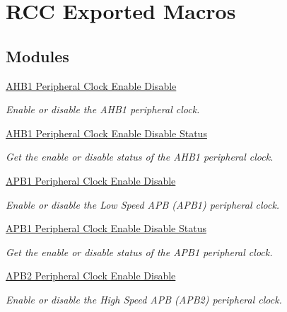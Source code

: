 \hypertarget{group___r_c_c___exported___macros}{}\section{R\+CC Exported Macros}
\label{group___r_c_c___exported___macros}
\subsection*{Modules}
\begin{DoxyCompactItemize}
\item 
\hyperlink{group___r_c_c___a_h_b1___clock___enable___disable}{A\+H\+B1 Peripheral Clock Enable Disable}
\begin{DoxyCompactList}\small\item\em Enable or disable the A\+H\+B1 peripheral clock. \end{DoxyCompactList}\item 
\hyperlink{group___r_c_c___a_h_b1___peripheral___clock___enable___disable___status}{A\+H\+B1 Peripheral Clock Enable Disable Status}
\begin{DoxyCompactList}\small\item\em Get the enable or disable status of the A\+H\+B1 peripheral clock. \end{DoxyCompactList}\item 
\hyperlink{group___r_c_c___a_p_b1___clock___enable___disable}{A\+P\+B1 Peripheral Clock Enable Disable}
\begin{DoxyCompactList}\small\item\em Enable or disable the Low Speed A\+PB (A\+P\+B1) peripheral clock. \end{DoxyCompactList}\item 
\hyperlink{group___r_c_c___a_p_b1___peripheral___clock___enable___disable___status}{A\+P\+B1 Peripheral Clock Enable Disable Status}
\begin{DoxyCompactList}\small\item\em Get the enable or disable status of the A\+P\+B1 peripheral clock. \end{DoxyCompactList}\item 
\hyperlink{group___r_c_c___a_p_b2___clock___enable___disable}{A\+P\+B2 Peripheral Clock Enable Disable}
\begin{DoxyCompactList}\small\item\em Enable or disable the High Speed A\+PB (A\+P\+B2) peripheral clock. \end{DoxyCompactList}\item 

\end{DoxyCompactItemize}
